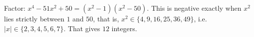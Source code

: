 Factor: $x^4-51x^2+50=(x^2-1)(x^2-50)$. This is negative exactly when $x^2$ lies strictly between $1$ and $50$, that is, $x^2\in\{4,9,16,25,36,49\}$, i.e.\ $|x|\in\{2,3,4,5,6,7\}$. That gives $\boxed{12}$ integers.
